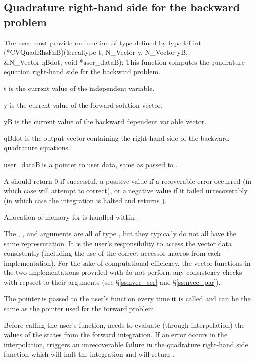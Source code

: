 \subsection{Quadrature right-hand side for the backward problem}
\label{sss:rhs_quad_B}
The user must provide an  function of type  defined by
{
  typedef int (*CVQuadRhsFnB)(&realtype t, N\_Vector y, N\_Vector yB, \\
                              &N\_Vector qBdot, void *user\_dataB);
}
{
  This function computes the quadrature equation right-hand side for the
  backward problem.
}
{
  \begin{args}
  \item[t]
    is the current value of the independent variable.
  \item[y]
    is the current value of the forward solution vector.
  \item[yB]
    is the current value of the backward dependent variable vector.
  \item[qBdot]
    is the output vector containing the right-hand side  of the backward
    quadrature equations.
  \item[user\_dataB]
    is a pointer to user data, same as passed to .
  \end{args}
}
{
  A  should return 0 if successful, a positive value if a recoverable
  error occurred (in which case {\cvodes} will attempt to correct), or a negative 
  value if it failed unrecoverably (in which case the integration is halted and
   returns ).
}
{
  Allocation of memory for  is handled within {\cvodes}.

  The , , and  arguments are all of type ,
  but they typically do not all have the same representation. It is the user's 
  responsibility to access the vector data consistently (including the use of the 
  correct accessor macros from each {\nvector} implementation). For the sake of 
  computational efficiency, the vector functions in the two {\nvector} implementations 
  provided with {\cvodes} do not perform any consistency checks with repsect to their 
   arguments (see \S\ref{ss:nvec_ser} and \S\ref{ss:nvec_par}).

  The  pointer is passed to the user's  function every time 
  it is called and can be the same as the  pointer used for the forward problem.

  {\warn}Before calling the user's  function, {\cvodes} needs to evaluate
  (through interpolation) the values of the states from the forward integration. 
  If an error occurs in the interpolation, {\cvodes} triggers an unrecoverable
  failure in the quadrature right-hand side function which will halt the integration and
   will return .
}

